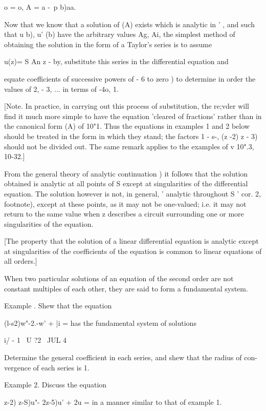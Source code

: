  o = o, A = a -\ p b)aa.

Now that we know that a solution of (A) exists which is analytic in '
, and such that u b), u' (b) have the arbitrary values Ag, Ai, the
simplest method of obtaining the solution in the form of a Taylor's
series is to assume

u(z)= S An z - by, substitute this series in the differential
equation and

equate coefficients of successive powers of - 6 to zero ) to
determine in order the values of 2, - 3, ... in terms of -4o, 1.

[Note. In practice, in carrying out this process of substitution, the
re;vder will find it much more simple to have the equation 'cleared of
fractions' rather than in the canonical form (A) of 10"1. Thus the
equations in examples 1 and 2 below should be treated in the form in
which they stand; the factors 1 - s-, (z -2) z - 3) should not be
divided out. The same remark applies to the examples of v 10".3,
10-32.]

From the general theory of analytic continuation ) it follows
that the solution obtained is analytic at all points of S except at
singularities of the differential equation. The solution however is
not, in general, ' analytic throughout S '  cor. 2, footnote),
except at these points, as it may not be one-valued; i.e. it may not
return to the same value when z describes a circuit surrounding one or
more singularities of the equation.

%
%

[The property that the solution of a linear differential equation is
analytic except at singularities of the coefficients of the equation
is common to linear equations of all orders.]

When two particular solutions of an equation of the second order are
not constant multiples of each other, they are said to form a
fundamental system.

Example . Shew that the equation

(l-s2)w"-2.-w' + |i = has the fundamental system of solutions

i/ - 1 \ U ?2 \ JUL 4 \

Determine the general coefficient in each series, and shew that the
radius of con- vergence of each series is 1.

Example 2. Discuss the equation

 z-2) z-S)u"- 2z-5)u' + 2u = in a manner similar to that of example 1.

